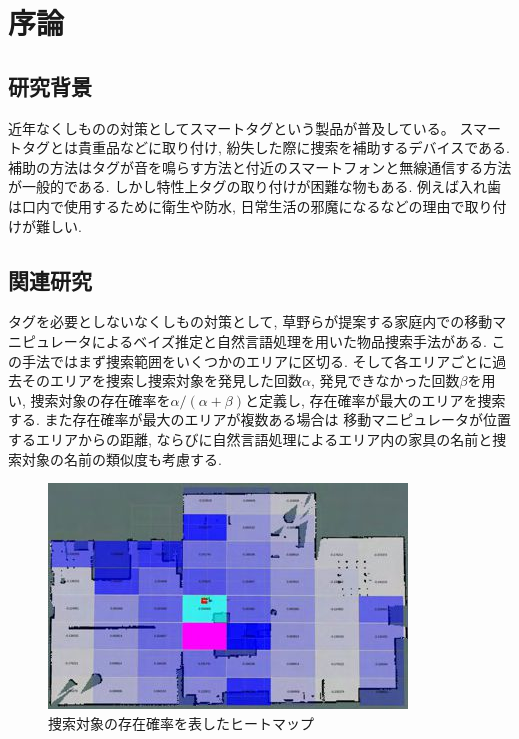 \chapter{序論}

\section{研究背景}
近年なくしものの対策としてスマートタグという製品が普及している。
スマートタグとは貴重品などに取り付け, 紛失した際に捜索を補助するデバイスである. 
補助の方法はタグが音を鳴らす方法と付近のスマートフォンと無線通信する方法が一般的である. 
しかし特性上タグの取り付けが困難な物もある. 
例えば入れ歯は口内で使用するために衛生や防水, 日常生活の邪魔になるなどの理由で取り付けが難しい. 

\section{関連研究}
タグを必要としないなくしもの対策として, 草野らが提案する家庭内での移動マニピュレータによるベイズ推定と自然言語処理を用いた物品捜索手法\cite{kusano}がある. 
この手法ではまず捜索範囲をいくつかのエリアに区切る. 
そして各エリアごとに過去そのエリアを捜索し捜索対象を発見した回数$\alpha$, 発見できなかった回数$\beta$を用い, 
捜索対象の存在確率を$ \alpha / (\alpha + \beta)$と定義し, 存在確率が最大のエリアを捜索する. 
また存在確率が最大のエリアが複数ある場合は
移動マニピュレータが位置するエリアからの距離, 
ならびに自然言語処理によるエリア内の家具の名前と捜索対象の名前の類似度も考慮する. 

\begin{figure}[H]
    \begin{center}
        \includegraphics[width=0.8\linewidth]{figs/kusano.jpg}
        \caption{捜索対象の存在確率を表したヒートマップ\cite{kusano}}%
        \label{fig:kusano}
    \end{center}
\end{figure}

